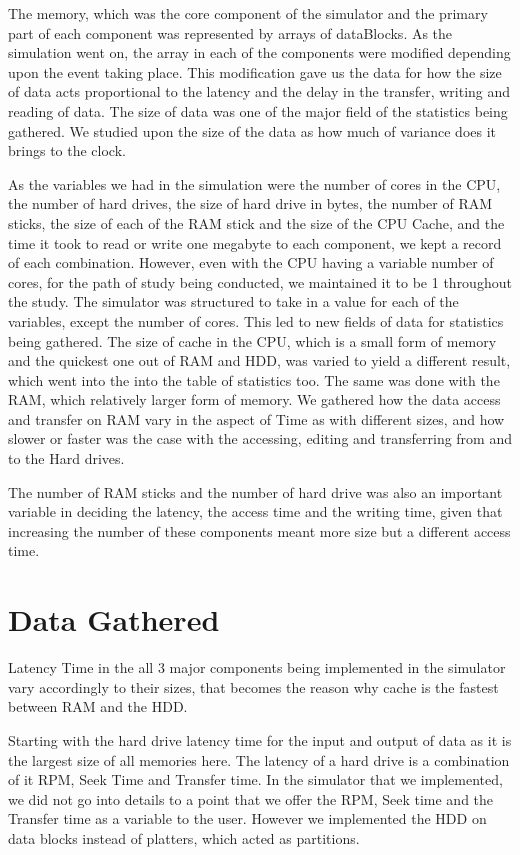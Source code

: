 \documentclass[12pt]{article}
\begin{document}
The memory, which was the core component of the simulator and the primary part of each component
was represented by arrays of dataBlocks. As the simulation went on, the array in each of the components
were modified depending upon the event taking place. This modification gave us the data for how the size
of data acts proportional to the latency and the delay in the transfer, writing and reading of data. The size
of data was one of the major field of the statistics being gathered. We studied upon the size of the
data as how much of variance does it brings to the clock.

As the variables we had in the simulation were the number of cores in the CPU,
the number of hard drives, the size of hard drive in bytes, the number of RAM sticks, the size of
each of the RAM stick and the size of the CPU Cache, and the time it took to read or write one megabyte to each component,
we kept a record of each combination. However, even with the CPU having a variable number of cores,
for the path of study being conducted, we maintained
it to be 1 throughout the study. The simulator was structured to take in a value for each of the variables,
except the number of cores. This led to new fields of data for statistics being gathered.
The size of cache in the CPU, which is a small form of memory and the quickest one out of RAM and HDD, was
varied to yield a different result, which went into the into the table of statistics too.
The same was done with the RAM, which relatively larger form of memory. We gathered how the data access
and transfer on RAM vary in the aspect of Time as with different sizes, and how slower or faster was the case
with the accessing, editing and transferring from and to the Hard drives.

The number of RAM sticks and the number of hard drive was also an important variable in deciding the latency,
the access time and the writing time, given that increasing the number of these components meant more
size but a different access time.

\section{Data Gathered}
\label{sec:data}

Latency Time in the all 3 major components being implemented in the simulator vary accordingly to their sizes,
that becomes the reason why cache is the fastest between RAM and the HDD.

Starting with the hard drive latency time for the input and output of data as it is the largest size of all memories here.
The latency of a hard drive is a combination of it RPM, Seek Time and Transfer time. In the simulator that we
implemented, we did not go into details to a point that we offer the RPM, Seek time and the Transfer time as
a variable to the user. However we implemented the HDD on data blocks instead of platters, which acted as
partitions. 
\end{document}
